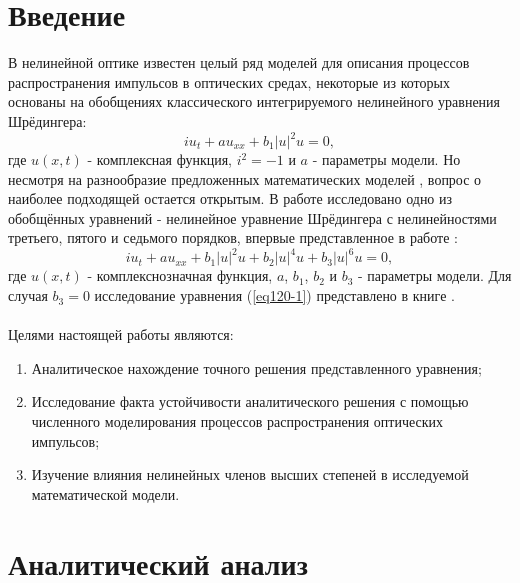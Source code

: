 \documentclass[12pt,a4paper]{article}
\begin{document}
\section{Введение}\label{ch120}
	В нелинейной оптике известен целый ряд моделей для описания процессов распространения импульсов в оптических средах, некоторые из которых основаны на обобщениях классического интегрируемого нелинейного уравнения Шрёдингера\cite{Rad04,Rad05}:
	\begin{equation}\label{eq1}
		iu_{t}+a u_{xx}+b_{1}|u|^2 u=0,
	\end{equation}
	где \(u(x,t)\) - комплексная функция, \(i^{2}=-1\) и \(a\) - параметры модели.
	Но несмотря на разнообразие предложенных математических моделей \cite{Rad9,Rad015,Rad017,Rad018,Rad019}, вопрос о наиболее подходящей остается открытым.
	В работе исследовано одно из обобщённых уравнений - нелинейное уравнение Шрёдингера с нелинейностями третьего, пятого и седьмого порядков, впервые представленное в работе \cite{Rad3}:
	\begin{equation}\label{eq120-1}
		iu_{t}+au_{xx}+b_{1}|u|^2 u+b_{2}|u|^4 u+b_{3}|u|^6 u=0,
	\end{equation}
	где \(u(x,t)\) - комплекснозначная функция, \(a\), \(b_{1}\), \(b_{2}\) и \(b_{3}\) - параметры модели. Для случая \(b_{3}=0\) исследование уравнения (\ref{eq120-1}) представлено в книге \cite{Rad02}.\\\\
	Целями настоящей работы являются:
	\begin{enumerate}
		\item Аналитическое нахождение точного решения представленного уравнения;
		\item Исследование факта устойчивости аналитического решения с помощью численного моделирования процессов распространения оптических импульсов;
		\item Изучение влияния нелинейных членов высших степеней в исследуемой математической модели.
	\end{enumerate}
\newpage

\section{Аналитический анализ}\label{ch200}
\end{document}
